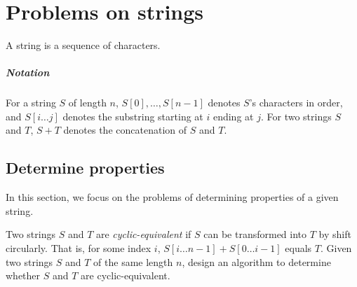 \chapter{Problems on strings}
A string is a sequence of characters.
\paragraph{Notation}
For a string $S$ of length $n$, $S[0], \dots, S[n - 1]$ denotes $S$'s characters in order, and $S[i \dots j]$ denotes the substring starting at $i$ ending at $j$.
For two strings $S$ and $T$, $S + T$ denotes the concatenation of $S$ and $T$.

\section{Determine properties}
In this section, we focus on the problems of determining properties of a given string.

\begin{Exercise}[title=Cyclic equality]
Two strings $S$ and $T$ are \emph{cyclic-equivalent} if $S$ can be transformed into $T$ by shift circularly.
That is, for some index $i$, $S[i\dots n - 1] + S[0 \dots i - 1]$ equals $T$.
Given two strings $S$ and $T$ of the same length $n$, design an algorithm to determine whether $S$ and $T$ are cyclic-equivalent.
\end{Exercise}

